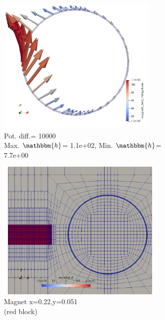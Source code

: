 \documentclass[11pt,a4paper,final]{article}
\begin{document}
\begin{figure}[h]
\begin{subfigure}{0.33\textwidth}
\centering
\includegraphics[width=0.85\textwidth]{x_10p.png}
\caption{\scriptsize Pot. diff.= 10000 \\ Max. $\mathbbm{h}$= 1.1e+02, Min. $\mathbbm{h}$= 7.7e+00}
\label{fig:1.5.3}
\end{subfigure}
\vspace{0.5cm}
\begin{subfigure}{0.32\textwidth}
\centering
\includegraphics[width=0.87\textwidth]{magnet_2x_p.png}
\caption{\scriptsize Magnet x=0.22,y=0.051 \\(red block)}
\label{fig:1.5.4}
\end{subfigure}
\begin{subfigure}{0.33\textwidth}
\centering

\end{subfigure}
\end{figure}
\end{document}
